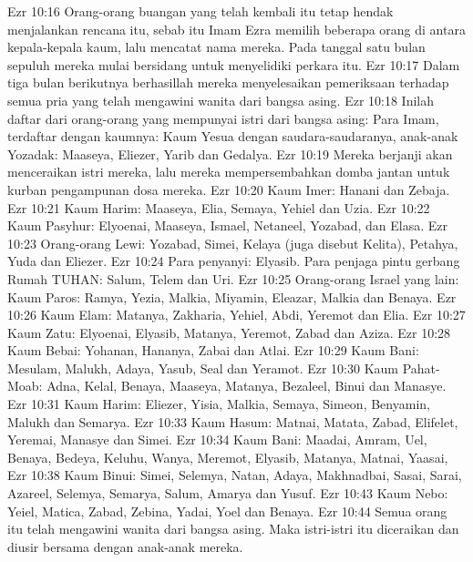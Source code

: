 Ezr 10:16  Orang-orang buangan yang telah kembali itu tetap hendak menjalankan rencana itu, sebab itu Imam Ezra memilih beberapa orang di antara kepala-kepala kaum, lalu mencatat nama mereka. Pada tanggal satu bulan sepuluh mereka mulai bersidang untuk menyelidiki perkara itu.
Ezr 10:17  Dalam tiga bulan berikutnya berhasillah mereka menyelesaikan pemeriksaan terhadap semua pria yang telah mengawini wanita dari bangsa asing.
Ezr 10:18  Inilah daftar dari orang-orang yang mempunyai istri dari bangsa asing: Para Imam, terdaftar dengan kaumnya: Kaum Yesua dengan saudara-saudaranya, anak-anak Yozadak: Maaseya, Eliezer, Yarib dan Gedalya.
Ezr 10:19  Mereka berjanji akan menceraikan istri mereka, lalu mereka mempersembahkan domba jantan untuk kurban pengampunan dosa mereka.
Ezr 10:20  Kaum Imer: Hanani dan Zebaja.
Ezr 10:21  Kaum Harim: Maaseya, Elia, Semaya, Yehiel dan Uzia.
Ezr 10:22  Kaum Pasyhur: Elyoenai, Maaseya, Ismael, Netaneel, Yozabad, dan Elasa.
Ezr 10:23  Orang-orang Lewi: Yozabad, Simei, Kelaya (juga disebut Kelita), Petahya, Yuda dan Eliezer.
Ezr 10:24  Para penyanyi: Elyasib. Para penjaga pintu gerbang Rumah TUHAN: Salum, Telem dan Uri.
Ezr 10:25  Orang-orang Israel yang lain: Kaum Paros: Ramya, Yezia, Malkia, Miyamin, Eleazar, Malkia dan Benaya.
Ezr 10:26  Kaum Elam: Matanya, Zakharia, Yehiel, Abdi, Yeremot dan Elia.
Ezr 10:27  Kaum Zatu: Elyoenai, Elyasib, Matanya, Yeremot, Zabad dan Aziza.
Ezr 10:28  Kaum Bebai: Yohanan, Hananya, Zabai dan Atlai.
Ezr 10:29  Kaum Bani: Mesulam, Malukh, Adaya, Yasub, Seal dan Yeramot.
Ezr 10:30  Kaum Pahat-Moab: Adna, Kelal, Benaya, Maaseya, Matanya, Bezaleel, Binui dan Manasye.
Ezr 10:31  Kaum Harim: Eliezer, Yisia, Malkia, Semaya, Simeon, Benyamin, Malukh dan Semarya.
Ezr 10:33  Kaum Hasum: Matnai, Matata, Zabad, Elifelet, Yeremai, Manasye dan Simei.
Ezr 10:34  Kaum Bani: Maadai, Amram, Uel, Benaya, Bedeya, Keluhu, Wanya, Meremot, Elyasib, Matanya, Matnai, Yaasai,
Ezr 10:38  Kaum Binui: Simei, Selemya, Natan, Adaya, Makhnadbai, Sasai, Sarai, Azareel, Selemya, Semarya, Salum, Amarya dan Yusuf.
Ezr 10:43  Kaum Nebo: Yeiel, Matica, Zabad, Zebina, Yadai, Yoel dan Benaya.
Ezr 10:44  Semua orang itu telah mengawini wanita dari bangsa asing. Maka istri-istri itu diceraikan dan diusir bersama dengan anak-anak mereka.


